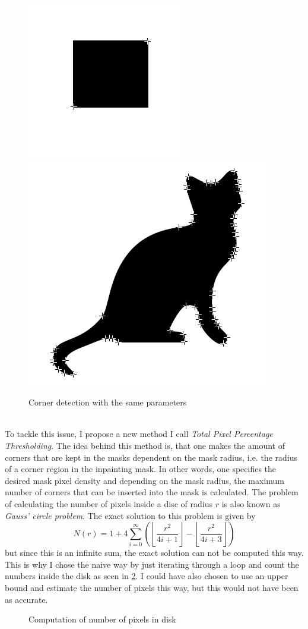 \begin{figure}[h!]
    \centering
    \includegraphics[width=0.4\linewidth]{../Images/example_rect_50.png}
    \includegraphics[width=0.4\linewidth]{../Images/example_cat_50.png}
    \caption{Corner detection with the same parameters}%
    \label{fig:PercExample}
\end{figure}\\
To tackle this issue, I propose a new method I call \textit{Total Pixel Percentage
Thresholding}. The idea behind this method is, that one makes the amount of corners that are kept
in the masks dependent on the mask radius, i.e. the radius of a corner region in the inpainting
mask. In other words, one specifies the desired mask pixel density and depending on the mask
radius, the maximum number of corners that can be inserted into the mask is calculated.
The problem of calculating the number of pixels inside a disc of radius $r$ is also known as
\textit{Gauss' circle problem}\cite{gaussCircle}. The exact solution to this problem is given
by\cite{hilbert96}
\begin{equation}
    N(r) = 1 + 4\sum_{i=0}^{\infty}\left(\left\lfloor\frac{r^2}{4i+1}\right\rfloor - \left\lfloor
    \frac{r^2}{4i+3}\right\rfloor\right)
\end{equation}
but since this is an infinite sum, the exact solution can not be computed this way. This is why I
chose the naive way by just iterating through a loop and count the numbers inside the disk as seen
in \ref{fig:PixelRegion}. 
I could have also chosen to use an upper bound and estimate the number of pixels this way, but this
would not have been as accurate.
\begin{figure}[h]
    \centering
    
    \caption{Computation of number of pixels in disk}
    \label{fig:PixelRegion}
\end{figure}

